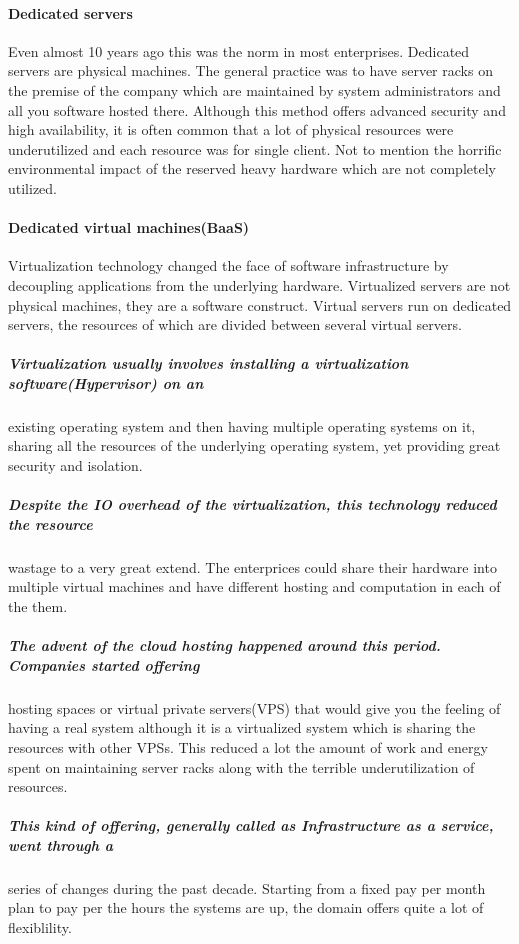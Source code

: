 \documentclass[12pt]{article}
\begin{document}
\paragraph{Dedicated servers}
\label{sec:orga87dc2a}
Even almost 10 years ago this was the norm in most enterprises. Dedicated servers
are physical machines. The general practice was to have server racks on the premise
of the company which are maintained by system administrators and all you software
hosted there. Although this method offers advanced security and high
availability, it is often common that a lot of physical resources were
underutilized and each resource was for single client. Not to mention the
horrific environmental impact of the reserved heavy hardware which are not
completely utilized.
\paragraph{Dedicated virtual machines(BaaS)}
\label{sec:org5cc78a7}
Virtualization technology changed the face of software infrastructure by decoupling
applications from the underlying hardware. Virtualized servers are not physical
machines, they are a software construct. Virtual servers run on dedicated
servers, the resources of which are divided between several virtual servers.
\subparagraph{Virtualization usually involves installing a virtualization software(Hypervisor) on an}
\label{sec:orgba74b1d}
existing operating system and then having multiple operating systems on it,
sharing all the resources of the underlying operating system, yet providing
great security and isolation.
\subparagraph{Despite the IO overhead of the virtualization, this technology reduced the resource}
\label{sec:org14c62a2}
wastage to a very great extend. The enterprices could share their hardware into
multiple virtual machines and have different hosting and computation in each of
the them. 
\subparagraph{The advent of the cloud hosting happened around this period. Companies started offering}
\label{sec:org77cd7b3}
hosting spaces or virtual private servers(VPS) that would give you the feeling
of having a real system although it is a virtualized system which is sharing the
resources with other VPSs. This reduced a lot the amount of work and energy spent on
maintaining server racks along with the terrible underutilization of resources.
\subparagraph{This kind of offering, generally called as Infrastructure as a service, went through a}
\label{sec:orge8bb8d3}
series of changes during the past decade. Starting from a fixed pay per month plan to pay per
the hours the systems are up, the domain offers quite a lot of flexiblility.
\end{document}

